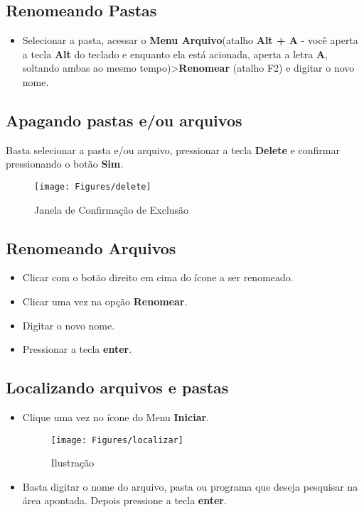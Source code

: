 \documentclass[hidelinks,12pt]{article}
\begin{document}
		\subsection{Renomeando Pastas}
		
		\begin{itemize}
			\item Selecionar a pasta, acessar o {\bf Menu Arquivo}(atalho {\bf Alt + A} - você aperta a tecla {\bf Alt} do teclado e enquanto ela está acionada, aperta a letra {\bf A}, soltando ambas ao mesmo tempo)>{\bf Renomear} (atalho F2) e digitar o novo nome.
		\end{itemize}
		
		\subsection{Apagando pastas e/ou arquivos}
		
		Basta selecionar a pasta e/ou arquivo, pressionar a tecla {\bf Delete} e confirmar pressionando o botão {\bf Sim}.
		
			\begin{figure}[!h]
				\centering
				\texttt{[image: Figures/delete]}
				\caption{Janela de Confirmação de Exclusão}
				\label{fig:delete}
			\end{figure}
		
		\subsection{Renomeando Arquivos}
		
		\begin{itemize}
			\item Clicar com o botão direito em cima do ícone a ser renomeado.
			\item Clicar uma vez na opção {\bf Renomear}.
			\item Digitar o novo nome.
			\item Pressionar a tecla {\bf enter}.
		\end{itemize}
		
		\subsection{Localizando arquivos e pastas}
		
		\begin{itemize}
			\item Clique uma vez no ícone do Menu {\bf Iniciar}.
			
			\begin{figure}[!h]
				\centering
				\texttt{[image: Figures/localizar]}
				\caption{Ilustração}
				\label{fig:localizar}
			\end{figure}
			
			\item  Basta digitar o nome do arquivo, pasta ou programa que deseja pesquisar na área apontada. Depois pressione a tecla {\bf enter}.
		\end{itemize}
		
\end{document}
